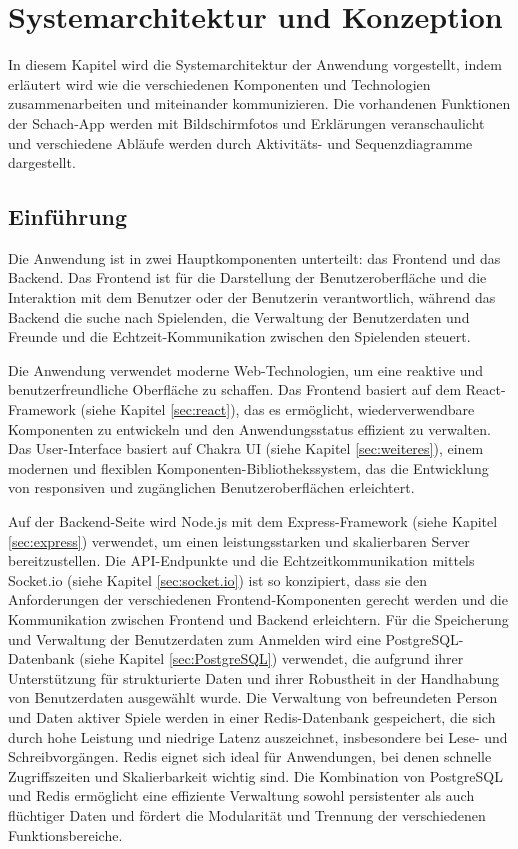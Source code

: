        
\chapter{Systemarchitektur und Konzeption}
In diesem Kapitel wird die Systemarchitektur der Anwendung vorgestellt, indem erläutert wird wie die verschiedenen Komponenten und Technologien zusammenarbeiten und miteinander kommunizieren. Die vorhandenen Funktionen der Schach-App werden mit Bildschirmfotos und Erklärungen veranschaulicht und verschiedene Abläufe werden durch Aktivitäts- und Sequenzdiagramme dargestellt.
\section{Einführung}
Die Anwendung ist in zwei Hauptkomponenten unterteilt: das Frontend und das Backend. Das Frontend ist für die Darstellung der Benutzeroberfläche und die Interaktion mit dem Benutzer oder der Benutzerin verantwortlich, während das Backend die suche nach Spielenden, die Verwaltung der Benutzerdaten und Freunde und die Echtzeit-Kommunikation zwischen den Spielenden steuert.

Die Anwendung verwendet moderne Web-Technologien, um eine reaktive und benutzerfreundliche Oberfläche zu schaffen. Das Frontend basiert auf dem React-Framework (siehe Kapitel \ref{sec:react}), das es ermöglicht, wiederverwendbare Komponenten zu entwickeln und den Anwendungsstatus effizient zu verwalten. Das User-Interface basiert auf Chakra UI (siehe Kapitel \ref{sec:weiteres}), einem modernen und flexiblen Komponenten-Bibliothekssystem, das die Entwicklung von responsiven und zugänglichen Benutzeroberflächen erleichtert.

Auf der Backend-Seite wird Node.js mit dem Express-Framework (siehe Kapitel \ref{sec:express}) verwendet, um einen leistungsstarken und skalierbaren Server bereitzustellen. Die API-Endpunkte und die Echtzeitkommunikation mittels Socket.io (siehe Kapitel \ref{sec:socket.io}) ist so konzipiert, dass sie den Anforderungen der verschiedenen Frontend-Komponenten gerecht werden und die Kommunikation zwischen Frontend und Backend erleichtern. Für die Speicherung und Verwaltung der Benutzerdaten zum Anmelden wird eine PostgreSQL-Datenbank  (siehe Kapitel \ref{sec:PostgreSQL}) verwendet, die aufgrund ihrer Unterstützung für strukturierte Daten und ihrer Robustheit in der Handhabung von Benutzerdaten ausgewählt wurde. Die Verwaltung von befreundeten Person und Daten aktiver Spiele werden in einer Redis-Datenbank gespeichert, die sich durch hohe Leistung und niedrige Latenz auszeichnet, insbesondere bei Lese- und Schreibvorgängen. Redis eignet sich ideal für Anwendungen, bei denen schnelle Zugriffszeiten und Skalierbarkeit wichtig sind. Die Kombination von PostgreSQL und Redis ermöglicht eine effiziente Verwaltung sowohl persistenter als auch flüchtiger Daten und fördert die Modularität und Trennung der verschiedenen Funktionsbereiche.
